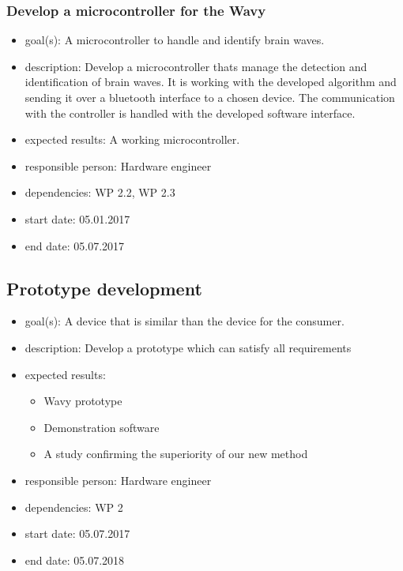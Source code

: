 \subsubsection{Develop a microcontroller for the Wavy}
\begin{itemize}
 \item goal(s): A microcontroller to handle and identify brain waves.
 \item description: Develop a microcontroller thats manage the detection and identification of brain waves. It is working with the developed algorithm and sending it over a bluetooth interface to a chosen device. The communication with the controller is handled with the developed software interface.
 \item expected results: A working microcontroller.
 \item responsible person: Hardware engineer
 \item dependencies: WP 2.2, WP 2.3
 \item start date: 05.01.2017
 \item end date: 05.07.2017
\end{itemize}

\subsection{Prototype development}
\begin{itemize}
 \item goal(s): A device that is similar than the device for the consumer.
 \item description: Develop a prototype which can satisfy all requirements
 \item expected results:
 \begin{itemize}
  \item Wavy prototype
  \item Demonstration software
  \item A study confirming the superiority of our new method
 \end{itemize}
 \item responsible person: Hardware engineer
 \item dependencies: WP 2
 \item start date: 05.07.2017
 \item end date: 05.07.2018
\end{itemize}


